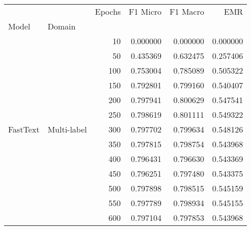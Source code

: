 \begin{tabular}{llrrrr}
\toprule
         &             &  Epochs &  F1 Micro &   F1 Macro &       EMR \\
Model & Domain &         &           &            &           \\
\midrule
\multirow{13}{*}{FastText} & \multirow{13}{*}{Multi-label} &      10 &  0.000000 &   0.000000 &  0.000000 \\
         &             &      50 &  0.435369 &   0.632475 &  0.257406 \\
         &             &     100 &  0.753004 &   0.785089 &  0.505322 \\
         &             &     150 &  0.792801 &   0.799160 &  0.540407 \\
         &             &     200 &  0.797941 &   0.800629 &  0.547541 \\
         &             &     250 &  0.798619 &   0.801111 &  0.549322 \\
         &             &     300 &  0.797702 &   0.799634 &  0.548126 \\
         &             &     350 &  0.797815 &   0.798754 &  0.543968 \\
         &             &     400 &  0.796431 &   0.796630 &  0.543369 \\
         &             &     450 &  0.796251 &   0.797480 &  0.543375 \\
         &             &     500 &  0.797898 &   0.798515 &  0.545159 \\
         &             &     550 &  0.797789 &   0.798934 &  0.545155 \\
         &             &     600 &  0.797104 &   0.797853 &  0.543968 \\
\bottomrule
\end{tabular}
